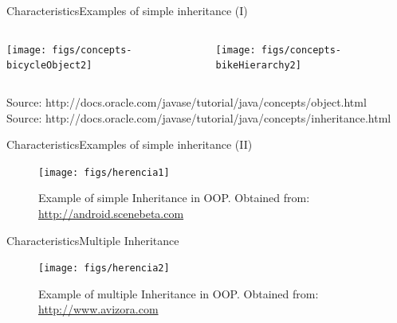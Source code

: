 \documentclass[10pt,compress]{beamer} %
\begin{document}
\begin{frame}{Characteristics}{Examples of simple inheritance (I)}
    \begin{columns}
	    \centering\texttt{[image: figs/concepts-bicycleObject2]}
	  
	  \centering \texttt{[image: figs/concepts-bikeHierarchy2]}\\
	
    \end{columns}
    \bigskip
	\centering \tiny{Source: http://docs.oracle.com/javase/tutorial/java/concepts/object.html}\\
	\centering \tiny{Source: http://docs.oracle.com/javase/tutorial/java/concepts/inheritance.html}\\
\end{frame}

\begin{frame}{Characteristics}{Examples of simple inheritance (II)}
	\begin{figure}
		\texttt{[image: figs/herencia1]}
		\caption{{\scriptsize Example of simple Inheritance in OOP. Obtained from: \url{http://android.scenebeta.com}}}
	\end{figure}
\end{frame}



\begin{frame}{Characteristics}{Multiple Inheritance}
	\begin{figure}
		\texttt{[image: figs/herencia2]}
		\caption{{\scriptsize Example of multiple Inheritance in OOP. Obtained from: \url{http://www.avizora.com}}}
	\end{figure}
\end{frame}
\end{document}
